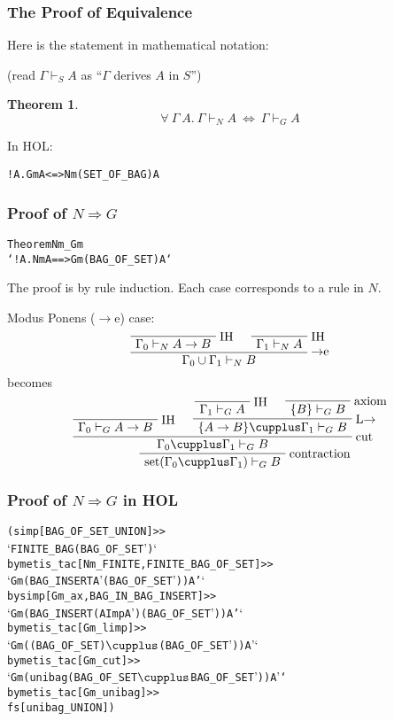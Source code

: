 \documentclass[english,svgnames,hide notes,12pt]{beamer}
\newtheorem{thm}{Theorem}
\theoremstyle{definition}
\theoremstyle{remark}
\begin{document}
\begin{frame}[fragile]
    \frametitle{The Proof of Equivalence}
    Here is the statement in mathematical notation:
    
    (read $\Gamma\vdash_S A$ as ``$\Gamma$ derives $A$ in $S$'')
    \begin{thm}
        \[\forall ~\Gamma ~A. ~\Gamma \vdash_N A ~\Leftrightarrow~ \Gamma \vdash_G A\]
    \end{thm}
    In HOL:

    \begin{alltt}
        !\textGamma A. Gm \textGamma A <=> Nm (SET_OF_BAG \textGamma) A
    \end{alltt}
\end{frame}

\begin{frame}[fragile]
    \frametitle{Proof of $N\Rightarrow G$}
\small
\begin{alltt}
Theorem Nm_Gm 
    `!\textGamma A. Nm \textGamma A ==> Gm (BAG_OF_SET \textGamma) A`
\end{alltt}
The proof is by rule induction. Each case corresponds to a rule in $N$.

Modus Ponens ($\to$e) case:
\[
    \AxiomC{}
    \RightLabel{IH}
    \UnaryInfC{$\Gamma_0\vdash_N A\to B$}
    \AxiomC{}
    \RightLabel{IH}
    \UnaryInfC{$\Gamma_1\vdash_N A$}
    \RightLabel{$\to$e}
    \BinaryInfC{$\Gamma_0\cup\Gamma_1 \vdash_N B$}
    \DisplayProof
\]
becomes
\[
    \AxiomC{}
    \RightLabel{IH}
    \UnaryInfC{$\Gamma_0 \vdash_G A \to B$}
    \AxiomC{}
    \RightLabel{IH}
    \UnaryInfC{$\Gamma_1 \vdash_G A$}
    \AxiomC{}
    \RightLabel{axiom}
    \UnaryInfC{$\{B\} \vdash_G B$}
    \RightLabel{L$\to$}
    \BinaryInfC{$\{A\to B\}\cupplus\Gamma_1\vdash_G B$}
    \RightLabel{cut}
    \BinaryInfC{$\Gamma_0\cupplus\Gamma_1\vdash_G B$}
    \RightLabel{contraction}
    \UnaryInfC{$\text{set}(\Gamma_0\cupplus\Gamma_1)\vdash_G B$}
    \DisplayProof
\]

\end{frame}

\begin{frame}[fragile] 
    \frametitle{Proof of $N\Rightarrow G$ in HOL}
    \small
\begin{alltt}
(simp[BAG_OF_SET_UNION] >>
`FINITE_BAG (BAG_OF_SET \textGamma')` 
  by metis_tac[Nm_FINITE,FINITE_BAG_OF_SET] >>
`Gm (BAG_INSERT A' (BAG_OF_SET \textGamma')) A'`
  by simp[Gm_ax,BAG_IN_BAG_INSERT] >>
`Gm (BAG_INSERT (A Imp A') (BAG_OF_SET \textGamma')) A'`
  by metis_tac[Gm_limp] >>
`Gm ((BAG_OF_SET \textGamma) \(\cupplus\) (BAG_OF_SET \textGamma')) A'`
  by metis_tac[Gm_cut] >>
`Gm (unibag (BAG_OF_SET \textGamma \(\cupplus\) BAG_OF_SET \textGamma')) A'` 
  by metis_tac[Gm_unibag] >>
fs[unibag_UNION])
\end{alltt}
\end{frame}
\end{document}

